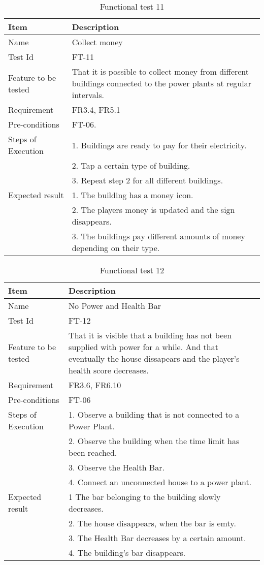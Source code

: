 \begin{table}[H]
\centering
	\begin{tabular}{ l | p{8cm} }
		\hline
		{\bf Item} & {\bf Description} \\ \hline
		Name & Collect money \\ 
		Test Id & FT-11 \\ 
		Feature to be tested & That it is possible to collect money from different buildings connected to the power plants at regular intervals. \\
		Requirement & FR3.4, FR5.1 \\ 
		Pre-conditions & FT-06. \\ 
		Steps of Execution & 1. Buildings are ready to pay for their electricity. \\
		& 2. Tap a certain type of building. \\ 
		& 3. Repeat step 2 for all different buildings. \\
		Expected result & 1. The building has a money icon. \\
		& 2. The players money is updated and the sign disappears. \\
		& 3. The buildings pay different amounts of money depending on their type. \\
	\end{tabular}
	\caption{Functional test 11}
\end{table}

\begin{table}[H]
\centering
	\begin{tabular}{ l | p{8cm} }
		\hline
		{\bf Item} & {\bf Description} \\ \hline
		Name & No Power and Health Bar \\ 
		Test Id & FT-12 \\ 
		Feature to be tested & That it is visible that a building has not been supplied with power for a while. And that eventually the house dissapears and the player's health score decreases. \\
		Requirement & FR3.6, FR6.10 \\ 
		Pre-conditions & FT-06 \\ 
		Steps of Execution &  1. Observe a building that is not connected to a Power Plant. \\ 
		& 2. Observe the building when the time limit has been reached. \\
		& 3. Observe the Health Bar. \\
		& 4. Connect an unconnected house to a power plant. \\
		Expected result & 1 The bar belonging to the building slowly decreases. \\
		& 2. The house disappears, when the bar is emty. \\
		& 3. The Health Bar decreases by a certain amount. \\
		& 4. The building's bar disappears. \\
	\end{tabular}
	\caption{Functional test 12}
\end{table}

